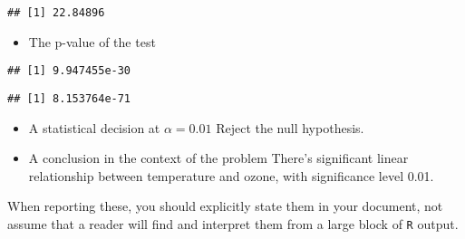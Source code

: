 \documentclass[
]{article}
\newenvironment{Shaded}{\begin{snugshade}}{\end{snugshade}}
\newcommand{\DecValTok}[1]{\textcolor[rgb]{0.00,0.00,0.81}{#1}}
\newcommand{\FunctionTok}[1]{\textcolor[rgb]{0.00,0.00,0.00}{#1}}
\newcommand{\NormalTok}[1]{#1}
\newcommand{\SpecialCharTok}[1]{\textcolor[rgb]{0.00,0.00,0.00}{#1}}
\providecommand{\tightlist}{%
  \setlength{\itemsep}{0pt}\setlength{\parskip}{0pt}}
\begin{document}
\begin{Shaded}
\end{Shaded}

\begin{verbatim}
## [1] 22.84896
\end{verbatim}

\begin{itemize}
\tightlist
\item
  The p-value of the test
\end{itemize}

\begin{Shaded}
\end{Shaded}

\begin{verbatim}
## [1] 9.947455e-30
\end{verbatim}

\begin{Shaded}
\end{Shaded}

\begin{verbatim}
## [1] 8.153764e-71
\end{verbatim}

\begin{itemize}
\item
  A statistical decision at \(\alpha = 0.01\) Reject the null
  hypothesis.
\item
  A conclusion in the context of the problem There's significant linear
  relationship between temperature and ozone, with significance level
  0.01.
\end{itemize}

When reporting these, you should explicitly state them in your document,
not assume that a reader will find and interpret them from a large block
of \texttt{R} output.
\end{document}
